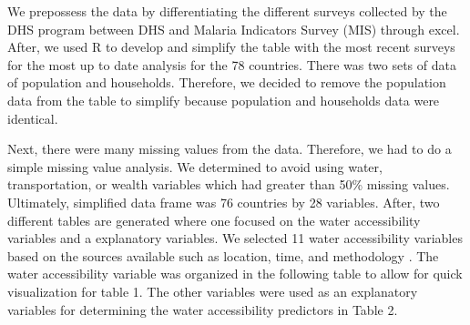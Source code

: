 \documentclass[10pt,twoside]{article}
\numberwithin{equation}{section}
\newcommand{\?}{\stackrel{?}{=}}
\begin{document}
We prepossess the data by differentiating the different surveys collected by the DHS program between DHS and Malaria Indicators Survey (MIS) through excel. After, we used R to develop and simplify the table with the most recent surveys for the most up to date analysis for the 78 countries. There was two sets of data of population and households. Therefore, we decided to remove the population data from the table to simplify because population and households data were identical. 

Next, there were many missing values from the data. Therefore, we had to do a simple missing value analysis. We determined to avoid using water, transportation, or wealth variables which had greater than 50\% missing values. Ultimately, simplified data frame was 76 countries by 28 variables. After, two different tables are generated where one focused on the water accessibility variables and a explanatory variables. We selected 11 water accessibility variables based on the sources available such as location, time, and methodology \citep{price2019difference}. The water accessibility variable was organized
in the following table to allow for quick visualization for table 1. The other variables were used as an explanatory variables for determining the water accessibility predictors in Table 2. 
\end{document}
